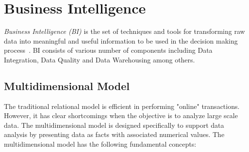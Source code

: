\section{Business Intelligence}\label{section:businessIntelligence}

\textit{Business Intelligence (BI)} is the set of techniques and tools for transforming raw data into meaningful and useful information to be used in the decision making process~\cite{Rud:Wiley:09}. BI consists of various number of components including Data Integration, Data Quality and Data Warehousing among others.

\subsection{Multidimensional Model}

The traditional relational model is efficient in performing "online" transactions. However, it has clear shortcomings when the objective is to analyze large scale data. The multidimensional model is designed specifically to support data analysis by presenting data as facts with associated numerical values. The multidimensional model has the following fundamental concepts:

